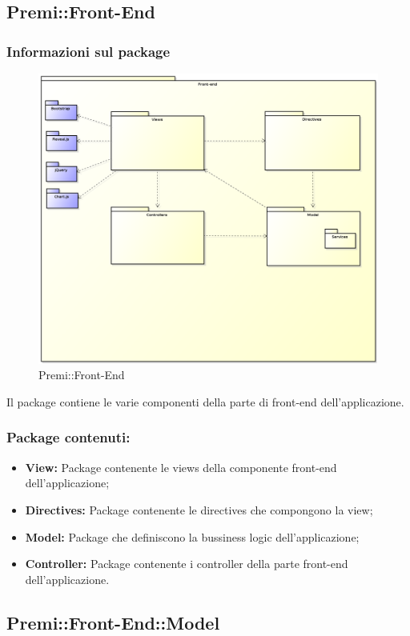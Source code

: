 \subsection{Premi::Front-End}
	\subsubsection*{Informazioni sul package}
		\begin{figure}[h]
			\centering
			\includegraphics[width=0.7\linewidth]{img/front-end-package}
			\caption[Premi::Front-End]{Premi::Front-End}
		\end{figure}
		Il package contiene le varie componenti della parte di front-end dell'applicazione.

	\subsubsection*{Package contenuti:}
		\begin{itemize}
			\item \textbf{View:} Package contenente le views della componente front-end dell'applicazione;
			\item \textbf{Directives:} Package contenente le directives che compongono la view;
			\item \textbf{Model:} Package che definiscono la bussiness logic dell'applicazione;
			\item \textbf{Controller:} Package contenente i controller della parte front-end dell'applicazione.
		\end{itemize}


\subsection{Premi::Front-End::Model}
